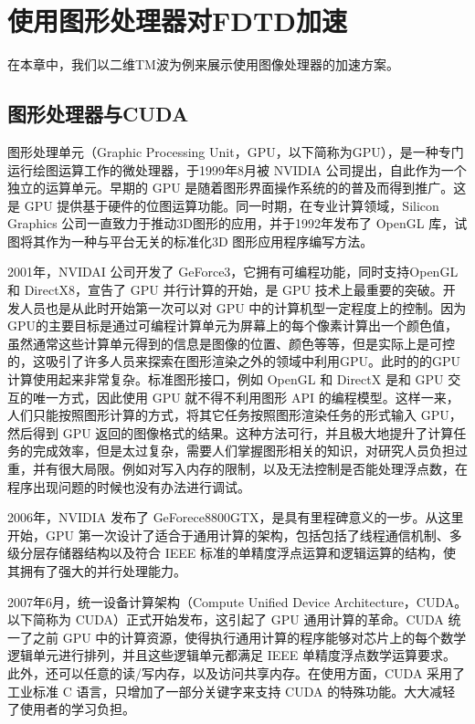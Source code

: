 
\chapter{使用图形处理器对FDTD加速}

在本章中，我们以二维TM波为例来展示使用图像处理器的加速方案。

\section{图形处理器与CUDA}

图形处理单元（Graphic Processing Unit，GPU，以下简称为GPU），是一种专门运行绘图运算工作的微处理器，于1999年8月被 NVIDIA 公司提出，自此作为一个独立的运算单元。早期的 GPU 是随着图形界面操作系统的的普及而得到推广。这是 GPU 提供基于硬件的位图运算功能。同一时期，在专业计算领域，Silicon Graphics 公司一直致力于推动3D图形的应用，并于1992年发布了 OpenGL 库，试图将其作为一种与平台无关的标准化3D 图形应用程序编写方法。

2001年，NVIDAI 公司开发了 GeForce3，它拥有可编程功能，同时支持\linebreak[4] OpenGL 和 DirectX8，宣告了 GPU 并行计算的开始，是 GPU 技术上最重要的突破。开发人员也是从此时开始第一次可以对 GPU 中的计算机型一定程度上的控制。因为GPU的主要目标是通过可编程计算单元为屏幕上的每个像素计算出一个颜色值，虽然通常这些计算单元得到的信息是图像的位置、颜色等等，但是实际上是可控的，这吸引了许多人员来探索在图形渲染之外的领域中利用GPU。此时的的GPU计算使用起来非常复杂。标准图形接口，例如 OpenGL 和 DirectX 是和 GPU 交互的唯一方式，因此使用 GPU 就不得不利用图形 API 的编程模型。这样一来，人们只能按照图形计算的方式，将其它任务按照图形渲染任务的形式输入 GPU，然后得到 GPU 返回的图像格式的结果。这种方法可行，并且极大地提升了计算任务的完成效率，但是太过复杂，需要人们掌握图形相关的知识，对研究人员负担过重，并有很大局限。例如对写入内存的限制，以及无法控制是否能处理浮点数，在程序出现问题的时候也没有办法进行调试。

2006年，NVIDIA 发布了 GeForece8800GTX，是具有里程碑意义的一步。从这里开始，GPU 第一次设计了适合于通用计算的架构，包括包括了线程通信机制、多级分层存储器结构以及符合 IEEE 标准的单精度浮点运算和逻辑运算的结构，使其拥有了强大的并行处理能力。

2007年6月，统一设备计算架构（Compute Unified Device Architecture，CUDA。以下简称为 CUDA）正式开始发布，这引起了 GPU 通用计算的革命。CUDA 统一了之前 GPU 中的计算资源，使得执行通用计算的程序能够对芯片上的每个数学逻辑单元进行排列，并且这些逻辑单元都满足 IEEE 单精度浮点数学运算要求。此外，还可以任意的读/写内存，以及访问共享内存。在使用方面，CUDA 采用了工业标准 C 语言，只增加了一部分关键字来支持 CUDA 的特殊功能。大大减轻了使用者的学习负担。


